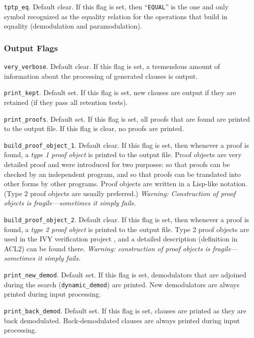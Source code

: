 \documentclass[11pt]{article}
\begin{document}
\noindent
\verb:tptp_eq:.  Default clear.  If this flag is set, then
``\verb:EQUAL:'' is the one and only symbol recognized as
the equality relation for the operations that build in equality
(demodulation and paramodulation).

\subsubsection{Output Flags} \label{output-flags}

\noindent
\verb:very_verbose:.  Default clear.  If this flag is set,
a tremendous amount of information about the processing of generated
clauses is output.

\noindent
\verb:print_kept:.  Default set.  If this flag is set, new
clauses are output if they are retained (if they pass all retention tests).

\noindent
\verb:print_proofs:.  Default set.
If this flag is set, all proofs that are found are printed to the output file.
If this flag is clear, no proofs are printed.

\noindent
\verb:build_proof_object_1:.  Default clear.  If this flag is set,
then whenever a proof is found, a
\emph{type 1 proof object} is printed to the output file.
Proof objects are very detailed proof and were introduced for two purposes: 
so that proofs can be checked by an independent program, and
so that proofs can be translated into other forms by other programs.
Proof objects are written in a Lisp-like notation.
(Type 2 proof objects are usually preferred.)
\emph{Warning: Construction of proof objects is fragile---sometimes it
simply fails.}

\noindent
\verb:build_proof_object_2:.  Default clear.  If this flag is set,
then whenever a proof is found, a
\emph{type 2 proof object} is printed to the output file.
Type 2 proof objects are used in the IVY verification project
\cite{ivy}, and a detailed description (definition in ACL2)
can be found there.
\emph{Warning: construction of proof objects is fragile---sometimes it
simply fails.}

\noindent
\verb:print_new_demod:.  Default set.  If this flag is set,
demodulators that are adjoined during the search (\verb:dynamic_demod:)
are printed.
New demodulators are always printed during input processing.

\noindent
\verb:print_back_demod:.  Default set.  If this flag is set,
clauses are printed as they are back demodulated.
Back-demodulated clauses are always printed during input processing.
\end{document}
